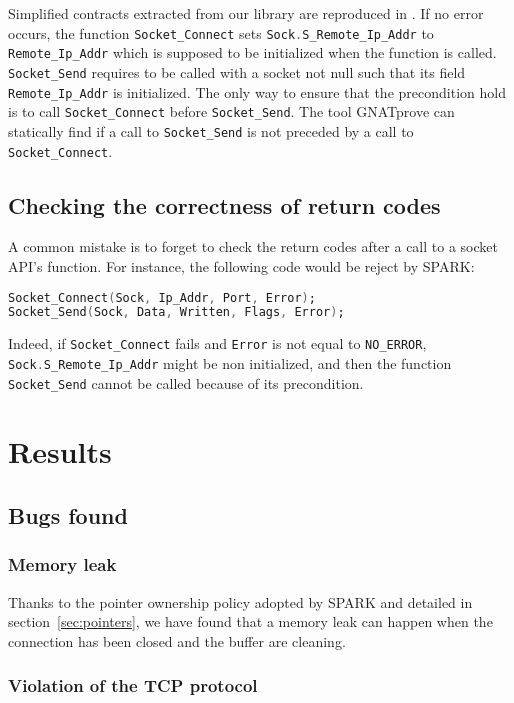 \documentclass[conference]{IEEEtran}
\def\spark#1{\lstinline[language=Ada]{#1}}
\begin{document}
Simplified contracts extracted from our library are reproduced in
. If no error occurs, the function
\spark{Socket_Connect} sets \spark{Sock.S_Remote_Ip_Addr} to
\spark{Remote_Ip_Addr} which is supposed to be
initialized when the function is called. \spark{Socket_Send} requires to be
called with a socket not null such that its field \spark{Remote_Ip_Addr} is
initialized. The only way to ensure that the precondition hold is to
call \spark{Socket_Connect} before \spark{Socket_Send}.
The tool GNATprove can statically find if a call to \spark{Socket_Send}
is not preceded by a call to \spark{Socket_Connect}.

\subsection{Checking the correctness of return codes}

A common mistake is to forget to check the return codes after a call to a socket
API's function. For instance, the following code would be reject by SPARK:
\begin{lstlisting}[language=Ada,basicstyle=\small\ttfamily]
Socket_Connect(Sock, Ip_Addr, Port, Error);
Socket_Send(Sock, Data, Written, Flags, Error);
\end{lstlisting}
Indeed, if \spark{Socket_Connect} fails and \spark{Error} is not equal to
\spark{NO_ERROR}, \spark{Sock.S_Remote_Ip_Addr} might be non initialized, and
then the function \spark{Socket_Send} cannot be called because of its
precondition.

\section{Results}
\label{sec:results}

\subsection{Bugs found}

\subsubsection{Memory leak}

Thanks to the pointer ownership policy adopted by SPARK and detailed in
section~\ref{sec:pointers}, we have found that a memory leak can happen when
the connection has been closed and the buffer are cleaning.

\subsubsection{Violation of the TCP protocol}
\end{document}
